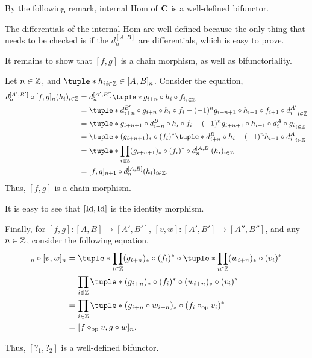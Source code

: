 By the following remark, internal Hom of \( \operatorname{\mathbf{C}} \) is a well-defined bifunctor.
\begin{remark}
    The differentials of the internal Hom are well-defined because the only thing that needs to be checked is if the \( d_n^{[A, B]} \) are differentials, which is easy to prove.

    It remains to show that \( [f, g] \) is a chain morphism, as well as bifunctoriality.

    Let \( n \in {\mathbb{Z}} \), and \( \tuple*{h_i}_{i \in \Zb} \in [A, B]_n \). Consider the equation,
    \begin{align*}
        d_n^{[A', B']} \circ [f, g]_n (h_i)_{i \in \Zb} &= d_n^{[A', B']} \tuple*{g_{i + n} \circ h_i \circ f_i}_{i \in \Zb} \\
        &= \tuple*{d_{i + n}^{B'} \circ g_{i + n} \circ h_i \circ f_i - (-1)^n g_{i + n + 1} \circ h_{i + 1} \circ f_{i + 1} \circ d_i^{A'}}_{i \in \Zb} \\
        &= \tuple*{g_{i + n + 1} \circ d_{i + n}^B \circ h_i \circ f_i - (-1)^n g_{i + n + 1} \circ h_{i + 1} \circ d_i^A \circ g_i}_{i \in \Zb} \\
        &= \tuple*{(g_{i + n + 1})_* \circ (f_i)^* \tuple*{d_{i + n}^B \circ h_i - (-1)^n h_{i + 1} \circ d_i^A}}_{i \in \Zb} \\
        &= \tuple*{\prod_{i \in \Zb} (g_{i + n + 1})_* \circ (f_i)^*} \circ d_n^{[A, B]} (h_i)_{i \in \Zb} \\
        &= [f, g]_{n + 1} \circ d_n^{[A, B]} (h_i)_{i \in \Zb}.
    \end{align*}
    Thus, \( [f, g] \) is a chain morphism.

    It is easy to see that \( [\operatorname{Id}, \operatorname{Id}] \) is the identity morphism.

    Finally, for \( [f, g]: [A, B] \to [A', B'] \), \( [v, w]: [A', B'] \to [A'', B''] \), and any \( n \in {\mathbb{Z}} \), consider the following equation,
    \begin{align*}
        [f, g]_n \circ [v, w]_n &= \tuple*{\prod_{i \in \Zb} (g_{i + n})_* \circ (f_i)^*} \circ \tuple*{\prod_{i \in \Zb} (w_{i + n})_* \circ (v_i)^*} \\
        &= \prod_{i \in \Zb} \tuple*{(g_{i + n})_* \circ (f_i)^* \circ (w_{i + n})_* \circ (v_i)^*} \\
        &= \prod_{i \in \Zb} \tuple*{(g_{i + n} \circ w_{i + n})_* \circ(f_i \circ_{\op} v_i)^*} \\
        &= [f \circ_{\op} v, g \circ w]_n.
    \end{align*}

    Thus, \( [?_1, ?_2] \) is a well-defined bifunctor.
\end{remark}

